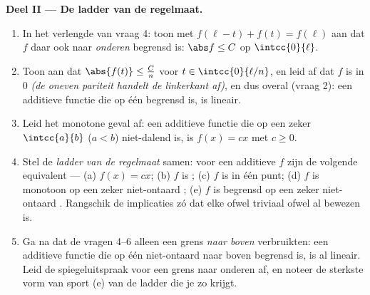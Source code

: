 \begin{problem}[{Weekendopgave --- $f(x + y) = f(x) + f(y)$: regelmaat
dwingt lineariteit af, en het portret van de monsters}]
\medskip
\noindent\textbf{Deel II --- De ladder van de regelmaat.}
\begin{enumerate}[resume]
  \item In het verlengde van vraag 4: toon met $f(\ell - t) + f(t) =
        f(\ell)$ aan dat $f$ daar ook naar \emph{onderen} begrensd is:
        $\abs f \leq C$ op $\intcc{0}{\ell}$.
  \item Toon aan dat $\abs{f(t)} \leq \frac{C}{n}$ voor $t \in
        \intcc{0}{\ell/n}$, en leid af dat $f$  is in $0$ \emph{(de
        oneven pariteit handelt de linkerkant af)}, en dus overal (vraag
        2): een additieve functie die op één  begrensd is, is
        lineair.
  \item Leid het monotone geval af: een additieve functie die op een
        zeker $\intcc{a}{b}$ ($a < b$) niet-dalend is, is $f(x) = cx$
        met $c \geq 0$.
  \item Stel de \emph{ladder van de regelmaat} samen: voor een additieve
        $f$ zijn de volgende  equivalent --- (a) $f(x) = cx$;
        (b) $f$ is ; (c) $f$ is  in één punt; (d) $f$ is
        monotoon op een zeker niet-ontaard ; (e) $f$ is begrensd
        op een zeker niet-ontaard . Rangschik de implicaties zó
        dat elke ofwel triviaal ofwel al bewezen is.
  \item Ga na dat de vragen 4--6 alleen een grens \emph{naar boven}
        verbruikten: een additieve functie die op één niet-ontaard
         naar boven begrensd is, is al lineair. Leid de
        spiegeluitspraak voor een grens naar onderen af, en noteer de
        sterkste vorm van sport (e) van de ladder die je zo krijgt.
\end{enumerate}


\end{problem}

